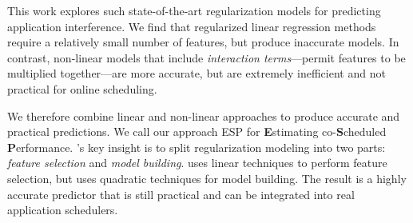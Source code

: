 This work explores such state-of-the-art regularization models for
predicting application interference.  We find that regularized linear
regression methods require a relatively small number of features, but
produce inaccurate models.  In contrast, non-linear models that
include \emph{interaction terms}---\ie permit features to be
multiplied together---are more accurate, but are extremely inefficient
and not practical for online scheduling.

We therefore combine linear and non-linear approaches to produce
accurate and practical predictions.  We call our approach ESP for
\textbf{E}stimating co-\textbf{S}cheduled \textbf{P}erformance.
\SYSTEMESP{}'s key insight is to split regularization modeling into two
parts: \emph{feature selection} and \emph{model building}.  \SYSTEMESP{}
uses linear techniques to perform feature selection, but uses
quadratic techniques for model building.  The result is a highly
accurate predictor that is still practical and can be integrated into
real application schedulers.


